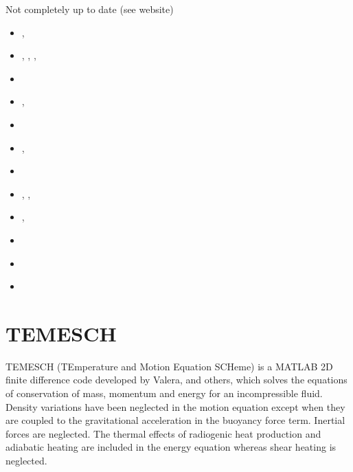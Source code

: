 Not completely up to date (see website)
\begin{small}
\begin{itemize}
\item[\twothousandeleven]     \textcite{qube11}, \textcite{ellw11}
\item[\twothousandtwelve]     \textcite{buit12}, \textcite{tebu12},
                              \textcite{crsg12}, \textcite{grel12}
\item[\twothousandthirteen]   \textcite{ghbu13}
\item[\twothousandfourteen]   \textcite{ghbu14}, \textcite{qubu14}
\item[\twothousandfifteen]    \textcite{nabu15}
\item[\twothousandsixteen]    \textcite{zwsn16}, \textcite{elwr16}
\item[\twothousandseventeen]  \textcite{nabp17}
\item[\twothousandeighteen]   \textcite{tebu18}, \textcite{fade18},  \textcite{weef18}
\item[\twothousandnineteen]   \textcite{elgb19}, \textcite{biem19}
\item[\twothousandtwenty]     \textcite{pena20}
\item[\twothousandtwentytwo]  \textcite{pefb22} 
\item[\twothousandtwentyfour] \textcite{hube24} 
\end{itemize}
\end{small}



\section{TEMESCH} 

TEMESCH (TEmperature
and Motion Equation SCHeme) is a MATLAB 2D finite difference code 
developed by Valera, and others, which
solves the equations of conservation of mass, momentum and energy
for an incompressible ﬂuid. Density variations have been neglected in
the motion equation except when they are coupled to the gravitational
acceleration in the buoyancy force term. Inertial forces are neglected. 
The thermal effects of radiogenic heat production and adiabatic heating 
are included in the energy equation 
whereas shear heating is neglected.

